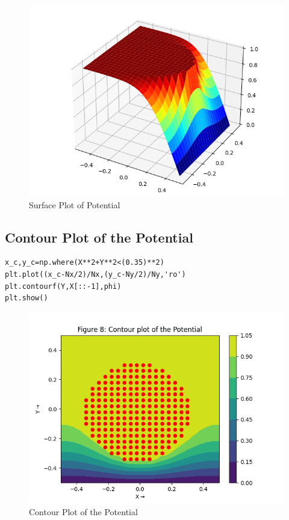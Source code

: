 \documentclass{article}
\begin{document}
\begin{figure}[h!]
\centering
\includegraphics[scale=0.4]{7}
\caption{Surface Plot of Potential}
\label{fig:3D Surface Plot of Potential}
\end{figure}



\subsection{Contour Plot of the Potential}
\begin{lstlisting}
x_c,y_c=np.where(X**2+Y**2<(0.35)**2)
plt.plot((x_c-Nx/2)/Nx,(y_c-Ny/2)/Ny,'ro')
plt.contourf(Y,X[::-1],phi)
plt.show()
\end{lstlisting}

\begin{figure}[h!]
\centering
\includegraphics[scale=0.4]{8}
\caption{Contour Plot of the Potential}
\label{fig:2D Contour Plot of the Potential}
\end{figure}
\clearpage
\end{document}
